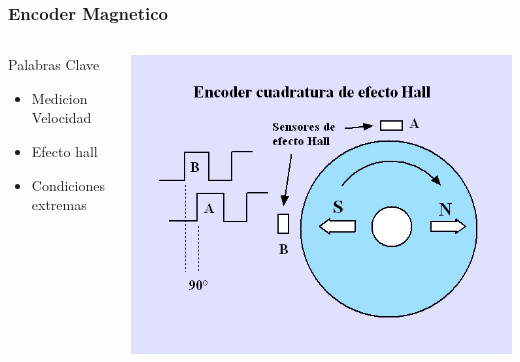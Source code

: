 \documentclass[12pt]{beamer}
\begin{document}
\begin{frame}
    \frametitle{Encoder Magnetico}
    \begin{columns}[T]
		\vspace*{-2cm}    
    		\begin{block}{Palabras Clave}
    		\begin{itemize}
    			\item Medicion Velocidad
    			\item \alert{Efecto hall}
    			\item Condiciones extremas
    		\end{itemize}
    		\end{block}
    		\vspace*{3cm}
    		\hspace*{-3cm}
    		\includegraphics[scale=.25]{encoder_magnetico.jpg}
    \end{columns}
    
\end{frame}




    
\end{document}
